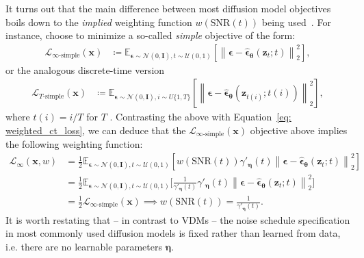 It turns out that the main difference between most diffusion model objectives boils down to the \textit{implied} weighting function $w(\mathrm{SNR}(t))$ being used~\citep{kingma2021variational,kingma2023understanding}. For instance, \cite{ho2020denoising,song2019generative,song2020improved,nichol2021improved} choose to minimize a so-called \textit{simple} objective of the form:
%
\begin{align}
    \mathcal{L}_{\infty\text{-}\mathrm{simple}}(\mathbf{x}) & \coloneqq \mathbb{E}_{\boldsymbol{\epsilon} \sim \mathcal{N}(0,\mathbf{I}), t \sim \mathcal{U}(0,1)} \left[ \left\| \boldsymbol{\epsilon} - \hat{\boldsymbol{\epsilon}}_{\boldsymbol{\theta}}(\mathbf{z}_t;t) \right\|^2_2 \right],
\end{align}
%
or the analogous discrete-time version
\begin{align}
    \mathcal{L}_{T\text{-}\mathrm{simple}}(\mathbf{x}) & \coloneqq \mathbb{E}_{\boldsymbol{\epsilon} \sim \mathcal{N}(0,\mathbf{I}), i \sim U\{1,T\}} \left[ \left\| \boldsymbol{\epsilon} - \hat{\boldsymbol{\epsilon}}_{\boldsymbol{\theta}}(\mathbf{z}_{t{(i)}};t{(i)}) \right\|^2_2 \right],
\end{align}
%
where $t(i) = i/T$ for $T$ . Contrasting the above with Equation~\ref{eq: weighted_ct_loss}, we can deduce that the $\mathcal{L}_{\infty\text{-}\mathrm{simple}}(\mathbf{x})$ objective above implies the following weighting function:
%
\begin{align}
    \mathcal{L}_\infty(\mathbf{x}, w) & = \frac{1} {2}\mathbb{E}_{\boldsymbol{\epsilon} \sim \mathcal{N}(0,\mathbf{I}),t \sim \mathcal{U}(0,1)}\left[ w(\mathrm{SNR}(t)) \gamma'_{\boldsymbol{\eta}}(t) \left\| \boldsymbol{\epsilon} - \hat{\boldsymbol{\epsilon}}_{\boldsymbol{\theta}}(\mathbf{z}_t;t) \right\|^2_2 \right]
    \\[5pt] & = \frac{1}{2} \mathbb{E}_{\boldsymbol{\epsilon} \sim \mathcal{N}(0,\mathbf{I}),t \sim \mathcal{U}(0,1)}\bigg[ \frac{1}{\gamma'_{\boldsymbol{\eta}}(t)} \gamma'_{\boldsymbol{\eta}}(t) \left\| \boldsymbol{\epsilon} - \hat{\boldsymbol{\epsilon}}_{\boldsymbol{\theta}}(\mathbf{z}_t;t) \right\|^2_2 \bigg] 
    \\[5pt] & = \frac{1}{2}\mathcal{L}_{\infty\text{-}\mathrm{simple}}(\mathbf{x}) \implies  w(\mathrm{SNR}(t)) = \frac{1}{\gamma'_{\boldsymbol{\eta}}(t)}.
\end{align}
%
It is worth restating that -- in contrast to VDMs -- the noise schedule specification in most commonly used diffusion models is fixed rather than learned from data, i.e. there are no learnable parameters $\boldsymbol{\eta}$.

